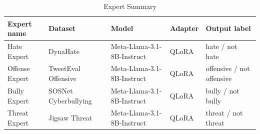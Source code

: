 
\begin{table}[htbp]
\centering
\caption{Expert Summary}
\label{tab:expert-summary}
\small
\begin{tabular}{p{2.4cm} p{2.8cm} p{3.1cm} p{2.0cm} p{3.1cm}}
\toprule
Expert name & Dataset & Model & Adapter & Output label \\
\midrule
Hate Expert & DynaHate & Meta-Llama-3.1-8B-Instruct & QLoRA & hate / not hate \\
Offense Expert & TweetEval Offensive & Meta-Llama-3.1-8B-Instruct & QLoRA & offensive / not offensive \\
Bully Expert & SOSNet Cyberbullying & Meta-Llama-3.1-8B-Instruct & QLoRA & bully / not bully \\
Threat Expert & Jigsaw Threat & Meta-Llama-3.1-8B-Instruct & QLoRA & threat / not threat \\
\bottomrule
\end{tabular}
\end{table}
